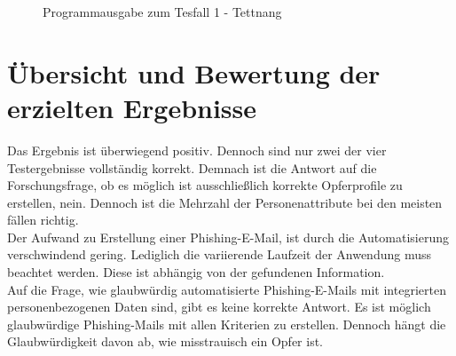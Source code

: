 			\begin{figure}[h!]
				\caption{Programmausgabe zum Tesfall 1 - Tettnang}
			\end{figure}
			\FloatBarrier
			
\section{Übersicht und Bewertung der erzielten Ergebnisse}
Das Ergebnis ist überwiegend positiv. Dennoch sind nur zwei der vier Testergebnisse vollständig korrekt. Demnach ist die Antwort auf die Forschungsfrage, ob es möglich ist ausschließlich korrekte Opferprofile zu erstellen, nein. Dennoch ist die Mehrzahl der Personenattribute bei den meisten fällen richtig. \\
Der Aufwand zu Erstellung einer Phishing-E-Mail, ist durch die Automatisierung verschwindend gering. Lediglich die variierende Laufzeit der Anwendung muss beachtet werden. Diese ist abhängig von der gefundenen Information.\\
Auf die Frage, wie glaubwürdig automatisierte Phishing-E-Mails mit integrierten personenbezogenen Daten sind, gibt es keine korrekte Antwort. Es ist möglich glaubwürdige Phishing-Mails mit allen Kriterien zu erstellen. Dennoch hängt die Glaubwürdigkeit davon ab, wie misstrauisch ein Opfer ist.
